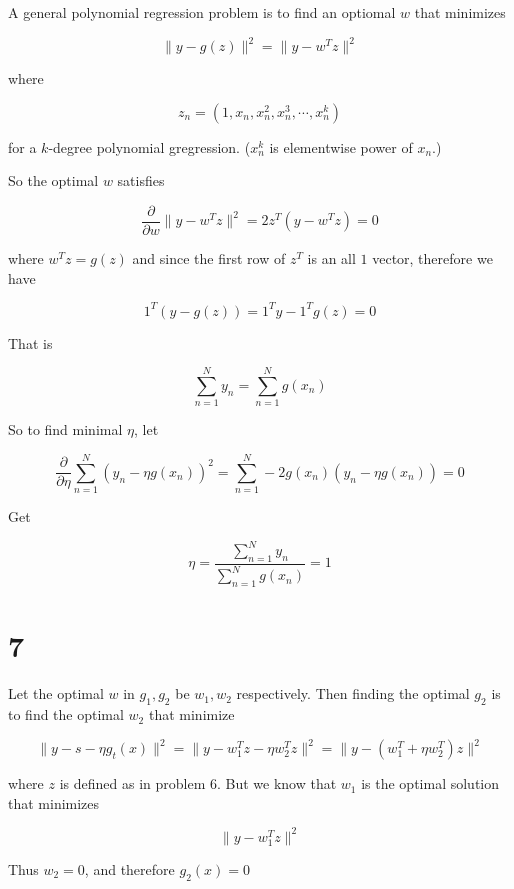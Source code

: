 \documentclass[fleqn,a4paper,12pt]{article}
\begin{document}
A general polynomial regression problem is to find an optiomal $w$ that minimizes

\begin{equation*}
  \lVert y - g(z) \rVert^2 = \lVert y - w^T z \rVert^2
\end{equation*}

where

\begin{equation*}
z_n = (1, x_n, x_n^2, x_n^3, \cdots, x_n^k)
\end{equation*}

for a $k$-degree polynomial gregression. ($x_n^k$ is elementwise power of $x_n$.)

So the optimal $w$ satisfies

\begin{equation*}
  \frac{\partial}{\partial w} \lVert y - w^T z \rVert^2 = 2z^T(y - w^T z) = 0
\end{equation*}

where $w^Tz = g(z)$ and since the first row of $z^T$ is an all $1$ vector, therefore we have

\begin{equation*}
  1^T(y - g(z)) = 1^T y - 1^T g(z) = 0
\end{equation*}

That is

\begin{equation*}
  \sum_{n=1}^N y_n = \sum_{n=1}^N g(x_n)
\end{equation*}

So to find minimal $\eta$, let

\begin{equation*}
  \frac{\partial}{\partial \eta} \sum_{n=1}^{N} (y_n - \eta g(x_n))^2 = \sum_{n=1}^N -2 g(x_n) (y_n - \eta g(x_n)) = 0
\end{equation*}

Get

\begin{equation*}
  \eta = \frac{\sum_{n=1}^N y_n}{\sum_{n=1}^N g(x_n)} = 1
\end{equation*}

\section*{7}

Let the optimal $w$ in $g_1, g_2$ be $w_1, w_2$ respectively. Then finding the optimal $g_2$ is to find the optimal $w_2$ that minimize

\begin{equation*}
  \lVert y - s - \eta g_t(x) \rVert^2 = \lVert y - w_1^T z - \eta w_2^T z \rVert^2 = \lVert y - (w_1^T +  \eta w_2^T) z \rVert^2
\end{equation*}

where $z$ is defined as in problem 6. But we know that $w_1$ is the optimal solution that minimizes 

\begin{equation*}
  \lVert y - w_1^T z \rVert^2
\end{equation*}

Thus $w_2 = 0$, and therefore $g_2(x) = 0$
\end{document}
